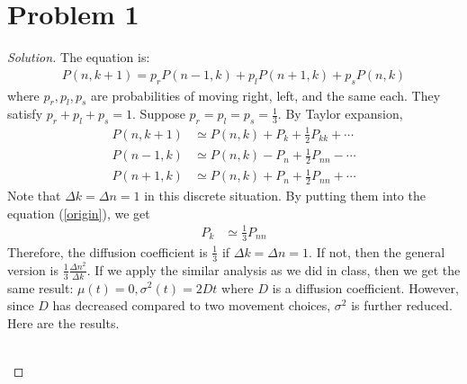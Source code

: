 \section*{Problem 1}
	\begin{proof} [Solution]
		The equation is:
		\begin{align}
			P(n, k + 1) = p_rP(n - 1, k) + p_lP(n + 1, k) + p_sP(n, k) \label{origin}
		\end{align}
		where $p_r, p_l, p_s$ are probabilities of moving right, left, and the same each. They satisfy $p_r + p_l + p_s = 1$. Suppose $p_r = p_l = p_s = \frac{1}{3}$. By Taylor expansion,
		\begin{align*}
			P(n, k + 1) &\simeq P(n, k) + P_k + \frac{1}{2}P_{kk} + \cdots\\
			P(n - 1, k) &\simeq P(n, k) - P_n + \frac{1}{2}P_{nn} - \cdots\\
			P(n + 1, k) &\simeq P(n, k) + P_n + \frac{1}{2}P_{nn} + \cdots
		\end{align*}
		Note that $\Delta k = \Delta n = 1$ in this discrete situation. By putting them into the equation (\ref{origin}), we get
		\begin{align*}
			P_k &\simeq \frac{1}{3}P_{nn}
		\end{align*}
		Therefore, the diffusion coefficient is $\frac{1}{3}$ if $\Delta k = \Delta n = 1$. If not, then the general version is $\frac{1}{3}\frac{{\Delta n}^2}{\Delta k}$. If we apply the similar analysis as we did in class, then we get the same result: $\mu(t) = 0, \sigma^2(t) = 2Dt$ where $D$ is a diffusion coefficient. However, since $D$ has decreased compared to two movement choices, $\sigma^2$ is further reduced. Here are the results.
		\begin{figure} [hbt!]
			\centering
		\end{figure}\\
	\end{proof}